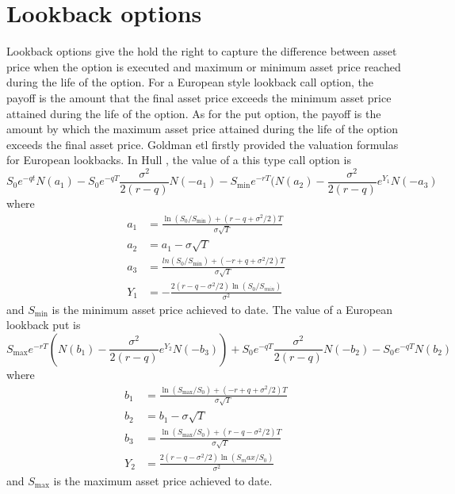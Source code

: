\documentclass[11pt]{book}
\begin{document}

\section{Lookback options}
Lookback options give the hold the right to capture the difference between asset price when the option is executed and maximum or minimum asset price reached during the life of the option. For a European style lookback call option, the payoff is the amount that the final asset price exceeds the minimum asset price attained during the life of the option. As for the put option, the payoff is the amount by which the maximum asset price attained during the life of the option exceeds the final asset price. Goldman etl firstly provided the valuation formulas for European lookbacks. In Hull \cite{Hull2008}, the value of a this type call option is 
\begin{equation}\label{eq:3}
S_0e^{-qt}N(a_1) - S_0 e^{-qT}\frac{\sigma ^2}{2(r-q)} N(-a_1) - S_{\min} e^{-rT}(N(a_2) - \frac{\sigma^2}{2(r-q)} e ^{Y_1} N(-a_3) 
\end{equation}
where
\begin{equation}\label{eq:4}
\begin{split}
a_1 &=\frac{\ln(S_0 / S_{\min}) + (r-q+\sigma^2 /2)T}{\sigma \sqrt{T}}\\
a_2 &= a_1 - \sigma \sqrt{T}\\
a_3 &= \frac{ln(S_0 / S_{\min})+ (-r+q+\sigma^2 / 2)T}{\sigma \sqrt{T}}\\
Y_1 &= - \frac{2(r-q-\sigma^2 / 2) \ln(S_0 / S_{min})}{\sigma^2}
\end{split}
\end{equation}
and $S_{\min}$ is the minimum asset price achieved to date. 
The value of a European lookback put is 
\begin{equation}\label{eq:5}
S_{\max} e^{-rT} ( N(b_1) - \frac{\sigma^2}{2(r-q)} e^{Y_2} N(-b_3)) + S_0 e^{-qT}\frac{\sigma^2}{2(r-q)} N(-b_2) - S_0 e^{-qT} N(b_2)
\end{equation}
where 
\begin{equation}\label{eq:6}
\begin{split}
b_1 &= \frac{\ln(S_{\max} / S_0) + (-r + q + \sigma^2 /2)T}{\sigma \sqrt{T}}\\
b_2 &= b_1 - \sigma \sqrt{T}\\
b_3 &= \frac{\ln(S_{\max} / S_0) + (r-q-\sigma^2 /2)T}{\sigma \sqrt{T}}\\
Y_2 &= \frac{2(r-q-\sigma^2 / 2) \ln(S_max / S_0)}{\sigma^2}
\end{split}
\end{equation}
and $S_{\max}$ is the maximum asset price achieved to date. 
\end{document}
